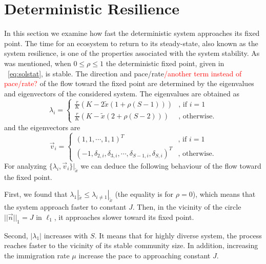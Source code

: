 \documentclass[9pt,twocolumn,twoside,lineno]{pnas-new}
\begin{document}


 
 \iffalse
\section{Deterministic Resilience}

In this section we examine how fast the deterministic system approaches its fixed point. The time for an ecosystem to return to its steady-state, also known as the system resilience, is one of the properties associated with the system stability.   As was mentioned, when $0\leq \rho\leq 1$ the deterministic fixed point, given in ~\eqref{eq:solstat}, is stable. The direction and pace/rate\textcolor{red}{/another term instead of pace/rate? } of the flow toward the fixed point are determined by the eigenvalues and eigenvectors of the considered system.  The eigenvalues are obtained as 
\begin{equation}
\lambda_i =
\begin{cases}
\frac{r}{K}\left( K - 2 \tilde{x}(1+\rho(S-1)) \right) & \text{, if } i=1 \\
\frac{r}{K}\left( K - \tilde{x}(2+\rho(S-2)) \right) & \text{, otherwise}.
\end{cases}
\end{equation}
and the eigenvectors are 
\begin{equation}
\vec{v}_i =
\begin{cases}
(1,1,\cdots,1,1)^T & \text{, if } i=1 \\
(-1,\delta_{2,i},\delta_{3,i},\cdots,\delta_{S-1,i},\delta_{S,i})^T & \text{, otherwise}.
\end{cases}
\end{equation}
For analyzing $\{\lambda_i,\vec{v}_i\}|_{\tilde{x}}$ we can deduce the following behaviour of the flow toward the fixed point.  

First, we found that $\lambda_1|_{\tilde{x}} \leq \lambda_{i\neq 1}|_{\tilde{x}}$ (the equality is for $\rho=0$), which means that the system approach faster to constant $J$. Then, in the vicinity of the circle $||\vec{n}||_1=J$ in $\ell_1$, it approaches slower toward its fixed point. 

Second, $|\lambda_1|$ increases with $S$. It means that for highly diverse system, the process reaches faster to the vicinity of its stable community size. In addition, increasing the immigration rate $\mu$ increase the pace to approaching constant $J$.   
\end{document}
